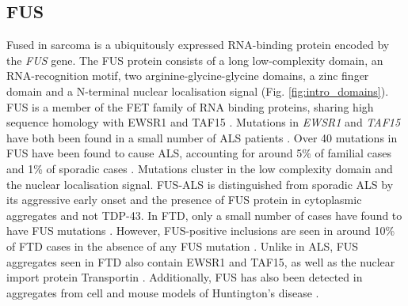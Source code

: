 %
%
%
%
%






\subsection{FUS}

Fused in sarcoma is a ubiquitously expressed RNA-binding protein encoded by the \textit{FUS} gene. 
The FUS protein consists of a long low-complexity domain, an RNA-recognition motif, two arginine-glycine-glycine domains, a zinc finger domain and a N-terminal nuclear localisation signal (Fig. \ref{fig:intro_domains}).
FUS is a member of the FET family of RNA binding proteins, sharing high sequence homology with EWSR1 and TAF15 \citep{Kovar2011}.
Mutations in \textit{EWSR1} and \textit{TAF15} have both been found in a small number of ALS patients \citep{Neumann2011, Couthouis2011,Ticozzi2011,Couthouis2012}.
Over 40 mutations in FUS have been found to cause ALS, accounting for around 5\% of familial cases and 1\% of sporadic cases \citep{Vance2009-ye,Kwiatkowski2009}.  
Mutations cluster in the low complexity domain and the nuclear localisation signal.
FUS-ALS is distinguished from sporadic ALS by its aggressive early onset and the presence of FUS protein in cytoplasmic aggregates and not TDP-43. 
In FTD, only a small number of cases have found to have FUS mutations  \citep{VanLangenhove2010,Broustal2010}.
However, FUS-positive inclusions are seen in around 10\% of FTD cases in the absence of any FUS mutation \citep{Neumann2009}. 
Unlike in ALS, FUS aggregates seen in FTD also contain EWSR1 and TAF15, as well as the nuclear import protein Transportin \citep{Neumann2011,Neumann2012}.
Additionally, FUS has also been detected in aggregates from cell and mouse models of Huntington's disease \citep{Doi2008, Kino2016}.

